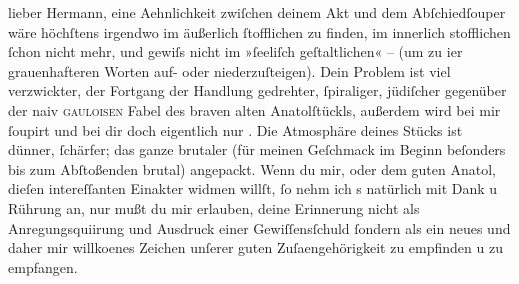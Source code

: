 \pstart{}lieber Hermann,\pend\vspace{0.5em}
\pstart
           eine Aehnlichkeit zwiſchen deinem
                  Akt und dem Abſchiedſouper wäre
               höchſtens irgendwo im äußerlich{ }ſtofflichen zu finden, im innerlich stofflichen{ }ſchon
               nicht mehr, und gewiſs nicht im  »ſeeliſch
               geſtaltlichen« – \introOben{}(\introOben{}um zu i{\geminationm}er
               grauenhafteren Worten auf- oder niederzuſteigen). Dein Problem ist viel verzwickter,
               der Fortgang der Handlung gedrehter,{ }ſpiraliger, jüdiſcher gegenüber der naiv \textsc{gauloisen} Fabel des braven alten Anatolſtückls, außerdem wird bei mir{ }ſoupirt und bei dir doch eigentlich nur
               \label{K_L01634-1v}\label{K_L01634-1}. Die Atmosphäre
               deines Stücks ist dünner,{ }ſchärfer; das ganze brutaler (für {\pb}meinen Geſchmack im
               Beginn beſonders bis zum Abſtoßenden brutal) angepackt. Wenn du mir, oder dem guten
                  Anatol, dieſen intereſſanten Einakter widmen
               willſt,{ }ſo nehm ich s natürlich mit Dank u Rührung an, nur mußt du mir erlauben,
               deine Erinnerung nicht als Anregungsquiirung und Ausdruck einer Gewiſſensſchuld{ }ſondern als ein neues und daher mir
                  willko{\geminationm}enes Zeichen unſerer guten Zuſa{\geminationm}engehörigkeit zu empfinden u zu empfangen.\pend
           
